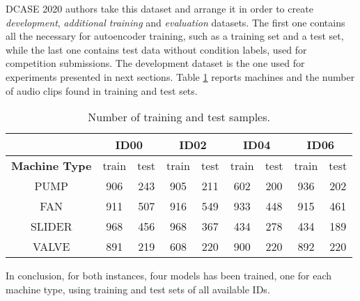 DCASE 2020 authors take this dataset and arrange it in order to create \textit{development}, \textit{additional training} and \textit{evaluation} datasets. The first one contains all the necessary for autoencoder training, such as a training set and a test set, while the last one contains test data without condition labels, used for competition submissions. The development dataset is the one used for experiments presented in next sections. Table \ref{training-test-sets-structure} reports machines and the number of audio clips found in training and test sets.\\

\begin{table}[ht]
\centering
\begin{tabular}{|c|c|c|c|c|c|c|c|c|} 
\cline{2-9}
\multicolumn{1}{c|}{} & \multicolumn{2}{c|}{\textbf{ID00}} & \multicolumn{2}{c|}{\textbf{ID02}} & \multicolumn{2}{c|}{\textbf{ID04}} & \multicolumn{2}{c|}{\textbf{ID06}} \\ 
\hline
\textbf{Machine Type} & train & test & train & test & train & test & train & test \\ 
\hline
PUMP & 906 & 243 & 905 & 211 & 602 & 200 & 936 & 202 \\ 
\hline
FAN & 911 & 507 & 916 & 549 & 933 & 448 & 915 & 461 \\ 
\hline
SLIDER & 968 & 456 & 968 & 367 & 434 & 278 & 434 & 189 \\ 
\hline
VALVE & 891 & 219 & 608 & 220 & 900 & 220 & 892 & 220 \\
\hline
\end{tabular}
\caption{Number of training and test samples.}
\label{training-test-sets-structure}
\end{table}
In conclusion, for both instances, four models has been trained, one for each machine type, using training and test sets of all available IDs.
